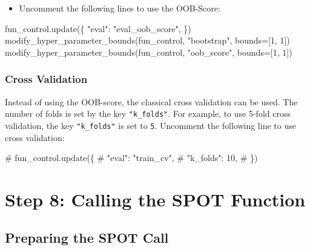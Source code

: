 \documentclass[
  letterpaper,
  DIV=11,
  numbers=noendperiod]{scrreprt}
\newenvironment{Shaded}{\begin{snugshade}}{\end{snugshade}}
\newcommand{\CommentTok}[1]{\textcolor[rgb]{0.37,0.37,0.37}{#1}}
\newcommand{\DecValTok}[1]{\textcolor[rgb]{0.68,0.00,0.00}{#1}}
\newcommand{\NormalTok}[1]{\textcolor[rgb]{0.00,0.23,0.31}{#1}}
\newcommand{\OperatorTok}[1]{\textcolor[rgb]{0.37,0.37,0.37}{#1}}
\newcommand{\StringTok}[1]{\textcolor[rgb]{0.13,0.47,0.30}{#1}}
\providecommand{\tightlist}{%
  \setlength{\itemsep}{0pt}\setlength{\parskip}{0pt}}\usepackage{longtable,booktabs,array}
\begin{document}
\begin{itemize}
\tightlist
\item
  Uncomment the following lines to use the OOB-Score:
\end{itemize}

\begin{Shaded}
\begin{Highlighting}[]
\NormalTok{fun\_control.update(\{}
    \StringTok{"eval"}\NormalTok{: }\StringTok{"eval\_oob\_score"}\NormalTok{,}
\NormalTok{\})}
\NormalTok{modify\_hyper\_parameter\_bounds(fun\_control, }\StringTok{"bootstrap"}\NormalTok{, bounds}\OperatorTok{=}\NormalTok{[}\DecValTok{1}\NormalTok{, }\DecValTok{1}\NormalTok{])}
\NormalTok{modify\_hyper\_parameter\_bounds(fun\_control, }\StringTok{"oob\_score"}\NormalTok{, bounds}\OperatorTok{=}\NormalTok{[}\DecValTok{1}\NormalTok{, }\DecValTok{1}\NormalTok{])}
\end{Highlighting}
\end{Shaded}

\hypertarget{cross-validation-1}{%
\subsubsection{Cross Validation}\label{cross-validation-1}}

Instead of using the OOB-score, the classical cross validation can be
used. The number of folds is set by the key \texttt{"k\_folds"}. For
example, to use 5-fold cross validation, the key \texttt{"k\_folds"} is
set to \texttt{5}. Uncomment the following line to use cross validation:

\begin{Shaded}
\begin{Highlighting}[]
\CommentTok{\# fun\_control.update(\{}
\CommentTok{\#      "eval": "train\_cv",}
\CommentTok{\#      "k\_folds": 10,}
\CommentTok{\# \})}
\end{Highlighting}
\end{Shaded}

\hypertarget{step-8-calling-the-spot-function-2}{%
\section{Step 8: Calling the SPOT
Function}\label{step-8-calling-the-spot-function-2}}

\hypertarget{sec-prepare-spot-call-16}{%
\subsection{Preparing the SPOT Call}\label{sec-prepare-spot-call-16}}
\end{document}
